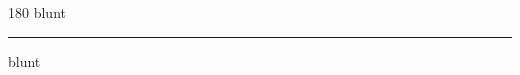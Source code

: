 
\begin{frame}
\begin{center}
\begin{turn}{180}
{\fontsize{2.5cm}{1em}\selectfont blunt}
\end{turn}
\vspace{1em}\par  
\hrule
\vspace{1em}\par  
{\fontsize{2.5cm}{1em}\selectfont blunt}
\end{center}
\end{frame}
